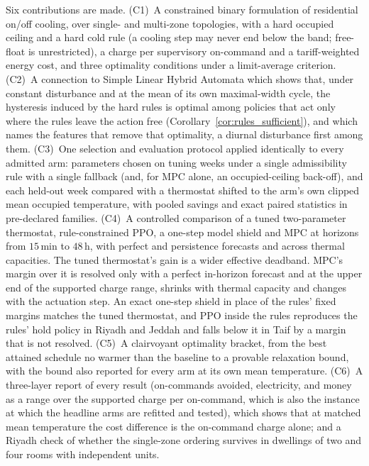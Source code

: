 \documentclass[pdflatex,sn-mathphys-num,iicol]{sn-jnl}
\theoremstyle{thmstyleone}\newtheorem{proposition}{Proposition}\newtheorem{corollary}{Corollary}
\theoremstyle{thmstyletwo}\newtheorem{remark}{Remark}\newtheorem{observation}{Observation}
\theoremstyle{thmstylethree}\newtheorem{definition}{Definition}
\begin{document}
Six contributions are made. (C1)~A constrained binary formulation of residential on/off cooling, over single- and multi-zone topologies, with a hard occupied ceiling and a hard cold rule (a cooling step may never end below the band; free-float is unrestricted), a charge per supervisory on-command and a tariff-weighted energy cost, and three optimality conditions under a limit-average criterion. (C2)~A connection to Simple Linear Hybrid Automata \citep{Mousa2016} which shows that, under constant disturbance and at the mean of its own maximal-width cycle, the hysteresis induced by the hard rules is optimal among policies that act only where the rules leave the action free (Corollary~\ref{cor:rules_sufficient}), and which names the features that remove that optimality, a diurnal disturbance first among them. (C3)~One selection and evaluation protocol applied identically to every admitted arm: parameters chosen on tuning weeks under a single admissibility rule with a single fallback (and, for MPC alone, an occupied-ceiling back-off), and each held-out week compared with a thermostat shifted to the arm's own clipped mean occupied temperature, with pooled savings and exact paired statistics in pre-declared families. (C4)~A controlled comparison of a tuned two-parameter thermostat, rule-constrained PPO, a one-step model shield and MPC at horizons from $15\,$min to $48\,$h, with perfect and persistence forecasts and across thermal capacities. The tuned thermostat's gain is a wider effective deadband. MPC's margin over it is resolved only with a perfect in-horizon forecast and at the upper end of the supported charge range, shrinks with thermal capacity and changes with the actuation step. An exact one-step shield in place of the rules' fixed margins matches the tuned thermostat, and PPO inside the rules reproduces the rules' hold policy in Riyadh and Jeddah and falls below it in Taif by a margin that is not resolved. (C5)~A clairvoyant optimality bracket, from the best attained schedule no warmer than the baseline to a provable relaxation bound, with the bound also reported for every arm at its own mean temperature. (C6)~A three-layer report of every result (on-commands avoided, electricity, and money as a range over the supported charge per on-command, which is also the instance at which the headline arms are refitted and tested), which shows that at matched mean temperature the cost difference is the on-command charge alone; and a Riyadh check of whether the single-zone ordering survives in dwellings of two and four rooms with independent units.
\end{document}
